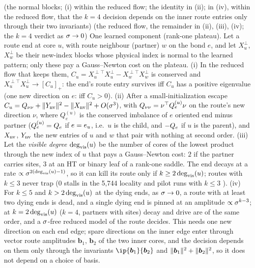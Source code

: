 \begin{proposition}\label{prop:A-trap}
  \proven{} (the normal blocks; (i) within the reduced flow; the identity in (ii); in (iv), within the reduced
  flow, that the $k=4$ decision depends on the inner route entries only through their two invariants) \derived{} (the reduced
  flow, the remainder in (ii), (iii), (iv); the $k=4$ verdict as $\sigma\to0$) 
  One learned component (rank-one plateau). Let a route end at core $u$, with route neighbour (partner) $w$
  on the bond $e$, and let $X_u^\perp$, $X_w^\perp$ be their new-index blocks whose physical index is normal to the
  learned pattern; only these pay a Gauss--Newton cost on the plateau. (i) In the reduced flow that keeps
  them, $C_u=X_u^{\perp\top}X_u^\perp-X_w^{\perp\top}X_w^\perp$ is conserved and $X_u^{\perp\top}X_u^\perp\to[C_u]_+$: the end's route
  entry survives iff $C_u$ has a positive eigenvalue (one new direction on $e$: iff $C_u>0$). (ii) After a
  small-initialization escape $C_u=Q_{\nu\nu}+\lVert Y_{\rm nv}\rVert^2-\lVert X_{\rm nv}\rVert^2+O(\sigma^3)$, with $Q_{\nu\nu}=\nu^{\top} Q^{(u)}_e\nu$ on
  the route's new direction $\nu$, where $Q^{(u)}_e$ is the conserved imbalance of $e$ oriented end minus partner
  ($Q^{(u)}_e=Q_{e}$ if $e=e_{u}$, i.e.\ $u$ is the child, and $-Q_{e}$ if $u$ is the parent), and $X_{\rm nv}$,
  $Y_{\rm nv}$ the new entries of $u$ and $w$ that pair with nothing at second order. (iii) Let the \emph{visible
  degree} $\deg_{\rm vis}(u)$ be the number of cores of the lowest product through the new index of $u$ that pays a
  Gauss--Newton cost: $2$ if the partner carries sites, $3$ at an HT or binary leaf of a rank-one saddle. The end
  decays at a rate $\propto\sigma^{2(\deg_{\rm vis}(u)-1)}$, so it can kill its route only if $k\ge2\deg_{\rm vis}(u)$;
  routes with $k\le3$ never trap (0 stalls in the 5,744 locality and pilot runs with $k\le3$ \empirical). (iv) For
  $k\le5$ and $k>2\deg_{\rm vis}(u)$ at the dying ends, as $\sigma\to0$, a route with at least two dying ends is dead,
  and a single dying end is pinned at an amplitude $\propto\sigma^{k-3}$; at $k=2\deg_{\rm vis}(u)$ ($k=4$, partners
  with sites) decay and drive are of the same order, and a $\sigma$-free reduced model of the route decides. This
  needs one new direction on each end edge; spare directions on the inner edge enter through vector route
  amplitudes $\boldsymbol b_1$, $\boldsymbol b_2$ of the two inner cores, and the decision depends on them only
  through the invariants $\ip{\boldsymbol b_1}{\boldsymbol b_2}$ and $\lVert\boldsymbol b_1\rVert^2+\lVert\boldsymbol b_2\rVert^2$, so it does
  not depend on a choice of basis.
\end{proposition}
